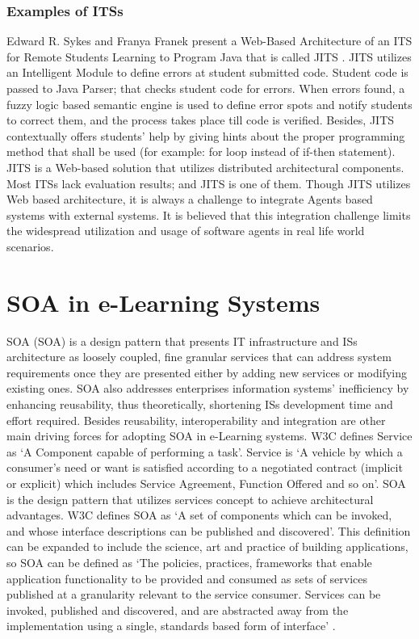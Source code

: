 \documentclass[12pt,a4paper,final,twoside,onecolumn,titlepage]{book}
\begin{document}
\subsubsection{Examples of ITSs}
Edward R. Sykes and Franya Franek present a Web-Based Architecture of an \gls{ITS} for Remote Students Learning to Program Java that is called JITS \cite{R50}. JITS utilizes an Intelligent Module to define errors at student submitted code. Student code is passed to Java Parser; that checks student code for errors. When errors found, a fuzzy logic based semantic engine is used to define error spots and notify students to correct them, and the process takes place till code is verified. Besides, JITS contextually offers students’ help by giving hints about the proper programming method that shall be used (for example: for loop instead of if-then statement). JITS is a Web-based solution that utilizes distributed architectural components. Most ITSs lack evaluation results; and JITS is one of them. Though JITS utilizes Web based architecture, it is always a challenge to integrate Agents based systems with external systems. It is believed that this integration challenge limits the widespread utilization and usage of software agents in real life world scenarios.

\section{SOA in e-Learning Systems}
\gls{SOA} (\gls{SOA}) is a design pattern that presents IT infrastructure and \gls{IS}s architecture as loosely coupled, fine granular services that can address system requirements once they are presented either by adding new services or modifying existing ones. \gls{SOA} also addresses enterprises information systems’ inefficiency by enhancing reusability, thus theoretically, shortening \gls{IS}s development time and effort required. Besides reusability, interoperability and integration are other main driving forces for adopting \gls{SOA} in e-Learning systems. \gls{W3C} defines Service as ‘A Component capable of performing a task’. Service is ‘A vehicle by which a consumer’s need or want is satisfied according to a negotiated contract (implicit or explicit) which includes Service Agreement, Function Offered and so on’. \gls{SOA} is the design pattern that utilizes services concept to achieve architectural advantages. \gls{W3C} defines \gls{SOA} as ‘A set of components which can be invoked, and whose interface descriptions can be published and discovered’. This definition can be expanded to include the science, art and practice of building applications, so \gls{SOA} can be defined as ‘The policies, practices, frameworks that enable application functionality to be provided and consumed as sets of services published at a granularity relevant to the service consumer. Services can be invoked, published and discovered, and are abstracted away from the implementation using a single, standards based form of interface’ \cite{R51}.
\end{document}
